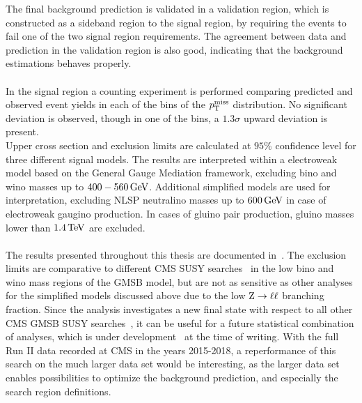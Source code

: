 The final background prediction is validated in a validation region, which is constructed as a sideband region to the signal region, by requiring the events to fail one of the two signal region requirements. The agreement between data and prediction in the validation region is also good, indicating that the background estimations behaves properly.\\\\
In the signal region a counting experiment is performed comparing predicted and observed event yields in each of the bins of the $p_{\mathrm{T}}^\text{miss}$ distribution. No significant deviation is observed, though in one of the bins, a $1.3\sigma$ upward deviation is present.\\
Upper cross section and exclusion limits are calculated at $95\%$ confidence level for three different signal models. The results are interpreted within a electroweak model based on the General Gauge Mediation framework,  excluding bino and wino masses up to $400-560\,\text{Ge\hspace{-.08em}V}$. Additional simplified models are used for interpretation, excluding NLSP neutralino masses up to $600\,\text{Ge\hspace{-.08em}V}$ in case of electroweak gaugino production. In cases of gluino pair production, gluino masses lower than $1.4\,\text{Te\hspace{-.08em}V}$ are excluded.\\\\
The results presented throughout this thesis are documented in~\cite{MyAN}. The exclusion limits are comparative to different CMS SUSY searches~\cite{PhotonMet} in the low bino and wino mass regions of the GMSB model, but are not as sensitive as other analyses for the simplified models discussed above due to the low $\mathrm{Z}\to\ell\ell$ branching fraction. Since the analysis investigates a new final state with respect to all other CMS GMSB SUSY searches~\cite{PhotonMet,PhotonHT,PhotonBJet}, it can be useful for a future statistical combination of analyses, which is under development~\cite{Danilo} at the time of writing. With the full Run II data recorded at CMS in the years 2015-2018, a reperformance of this search on the much larger data set would be interesting, as the larger data set enables possibilities to optimize the background prediction, and especially the search region definitions.
